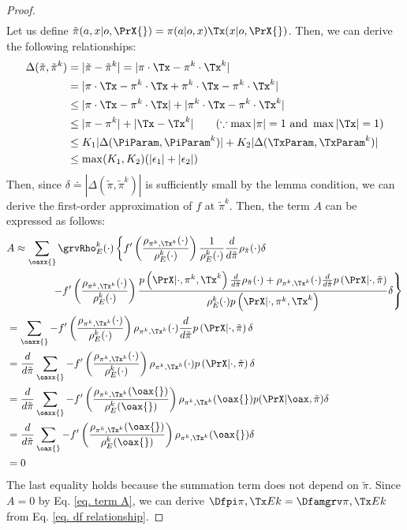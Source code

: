 \begin{proof}
\begin{align}
    \end{align}
    Let us define $\tilde{\pi}(a, x|o, \PrX{}) = \pi(a|o, x) \Tx(x|o, \PrX{})$. Then, we can derive the following relationships:
    \begin{align*}
        \Delta (\tilde{\pi}, \tilde{\pi}^k) &= |\tilde{\pi} -\tilde{\pi}^k| = |\pi\cdot \Tx - \pi^k \cdot \Tx^k| \\
        &= |\pi\cdot \Tx - \pi^k \cdot \Tx + \pi^k \cdot \Tx - \pi^k \cdot \Tx^k| \\
        &\leq |\pi\cdot \Tx - \pi^k \cdot \Tx| + |\pi^k \cdot \Tx - \pi^k \cdot \Tx^k| \\
        &\leq |\pi - \pi^k| + |\Tx - \Tx^k|  \qquad (\because \max |\pi| = 1 \text{ and } \max|\Tx|=1)\\
        &\leq K_1 |\Delta(\PiParam, \PiParamk)| + K_2|\Delta(\TxParam, \TxParamk)| \\
        &\leq \max(K_1, K_2)(|\epsilon_1| + |\epsilon_2|)
    \end{align*}
    Then, since $\delta \doteq |\Delta (\tilde{\pi}, \tilde{\pi}^k)|$ is sufficiently small by the lemma condition, we can derive the first-order approximation of $f$ at $\tilde{\pi}^k$. Then, the term $A$ can be expressed as follows:
    \begin{align}
        &A \approx  \sum_{\oaxx{}}\grvRho_E^k(\cdot) \left\{f'\left(\frac{\rhoPikTx{k}(\cdot)}{\rho_E^k(\cdot)}\right) \frac{1}{\rho_E^k(\cdot)} \frac{d}{d\tilde{\pi}}\rho_{\tilde{\pi}}(\cdot)\delta \right. \nonumber \\
        &\hspace{10ex}\left. - f'\left(\frac{\rhoPikTx{k}(\cdot)}{\rho_E^k(\cdot)}\right) 
        \frac{\qPrX{\pi^k, \Tx^k} \frac{d}{d\tilde{\pi}}\rho_{\tilde{\pi}}(\cdot) + \rhoPikTx{k}(\cdot) \frac{d}{d\tilde{\pi}}\qPrX{\tilde{\pi}}}{\rhoEoaxx{\cdot}} \delta
        \right\} \nonumber \\
        &= \sum_{\oaxx{}}
        -f'\left(\frac{\rhoPikTx{k}(\cdot)}{\rho_E^k(\cdot)}\right) \rhoPikTx{k}(\cdot) \frac{d}{d\tilde{\pi}}\qPrX{\tilde{\pi}} \delta\nonumber \\
        &=\frac{d}{d\tilde{\pi}}\sum_{\oaxx{}}
        -f'\left(\frac{\rhoPikTx{k}(\cdot)}{\rho_E^k(\cdot)}\right) \rhoPikTx{k}(\cdot)\qPrX{\tilde{\pi}} \delta \nonumber \\
        &=\frac{d}{d\tilde{\pi}}\sum_{\oaxx{}}
        -f'\left(\frac{\rhoPikTx{k}(\oax{})}{\rho_E^k(\oax{})}\right) \rhoPikTx{k}(\oax{})\postPrX{}{\tilde{\pi}} \delta \nonumber \\
        &=\frac{d}{d\tilde{\pi}}\sum_{\oax{}}
        -f'\left(\frac{\rhoPikTx{k}(\oax{})}{\rho_E^k(\oax{})}\right) \rhoPikTx{k}(\oax{})\delta \nonumber\\
        &=0 \label{eq. term A}
    \end{align}
    The last equality holds because the summation term does not depend on $\tilde{\pi}$. Since $A=0$ by Eq. \ref{eq. term A}, we can derive $\Dfpilemma{} = \Dfamlemma{}$ from Eq. \ref{eq. df relationship}.
\end{proof}


